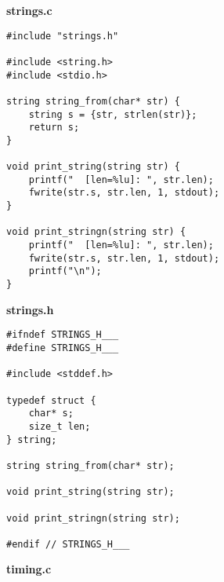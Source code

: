 \documentclass[subfiles]{main.tex}
\begin{document}
{\Large\textbf{strings.c}}

\begin{lstlisting}[style=rcom]
#include "strings.h"

#include <string.h>
#include <stdio.h>

string string_from(char* str) {
	string s = {str, strlen(str)};
	return s;
}

void print_string(string str) {
	printf("  [len=%lu]: ", str.len);
	fwrite(str.s, str.len, 1, stdout);
}

void print_stringn(string str) {
	printf("  [len=%lu]: ", str.len);
	fwrite(str.s, str.len, 1, stdout);
	printf("\n");
}
\end{lstlisting}

{\Large\textbf{strings.h}}

\begin{lstlisting}[style=rcom]
#ifndef STRINGS_H___
#define STRINGS_H___

#include <stddef.h>

typedef struct {
	char* s;
	size_t len;
} string;

string string_from(char* str);

void print_string(string str);

void print_stringn(string str);

#endif // STRINGS_H___
\end{lstlisting}

{\Large\textbf{timing.c}}
\end{document}
